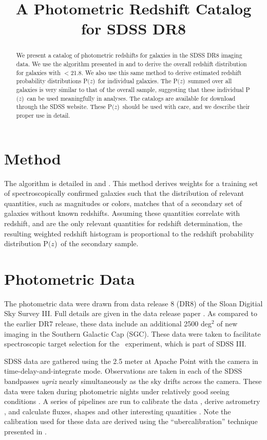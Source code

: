 \documentclass{emulateapj}
\newcommand{\rmax}{21.8}
\newcommand{\pofz}{P$(z$)}
\begin{document}
\title{A Photometric Redshift Catalog for SDSS DR8}



\begin{abstract}

We present a catalog of photometric redshifts for galaxies in the SDSS DR8
imaging data.  We use the algorithm presented in \citet{LimaPhotoz08} and
\citet{CunhaPhotoz09} to derive the overall redshift distribution for galaxies
with \rmag$ < $\rmax.  We also use this same method to derive estimated
redshift probability distributions \pofz\ for individual galaxies.  The \pofz\
summed over all galaxies is very similar to that of the overall sample,
suggesting that these individual \pofz\ can be used meaningfully in analyses.
The catalogs are available for download through the SDSS website.  These \pofz\
should be used with care, and we describe their proper use in detail.

\end{abstract}

\section{Method} \label{sec:method}

The algorithm is detailed in \citet{LimaPhotoz08} and \citet{CunhaPhotoz09}.
This method derives weights for a training set of spectroscopically confirmed
galaxies such that the distribution of relevant quantities, such as magnitudes
or colors, matches that of a secondary set of galaxies without known redshifts.
Assuming these quantities correlate with redshift, and are the only relevant
quantities for redshift determination, the resulting weighted redshift
histogram is proportional to the redshift probability distribution \pofz\ of the
secondary sample. 


\section{Photometric Data}

The photometric data were drawn from data release 8 (DR8) of the Sloan Digitial
Sky Survey III.  Full details are given in the data release paper \citet{dr8}.
As compared to the earlier DR7 release, these data include an additional 2500
deg$^2$ of new imaging in the Southern Galactic Cap (SGC). These data were
taken to facilitate spectroscopic target selection for the \boss\ experiment,
which is part of SDSS III.


SDSS data are gathered using the 2.5 meter at Apache Point \citep{Gunn06} with
the camera \citep{Gunn98} in time-delay-and-integrate mode.  Observations are
taken in each of the SDSS bandpasses {\it ugriz} nearly simultaneously as the
sky drifts across the camera.  These data were taken during photometric nights
under relatively good seeing conditions \citep{Hogg01}.  A series of pipelines
are run to calibrate the data \citep{Nikhil08,Smith02,Tucker06}, derive
astrometry \citep{Pier03}, and calculate fluxes, shapes and other interesting
quantities \citep{LuptonADASS01}.  Note the calibration used for these data are
derived using the ``ubercalibration'' technique presented in \citet{Nikhil08}.
\end{document}
